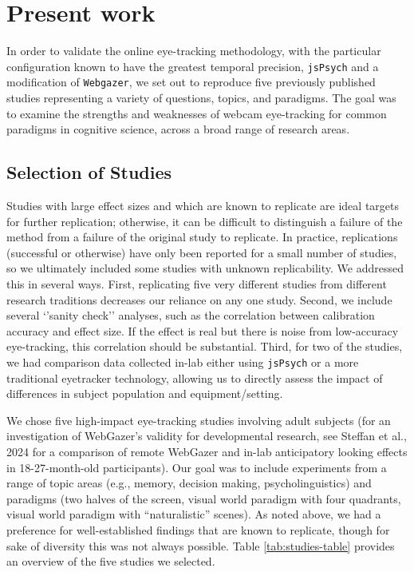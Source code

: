 \documentclass[
  man,floatsintext]{apa6}
\begin{document}
\section{Present work}\label{present-work}

In order to validate the online eye-tracking methodology, with the particular configuration known to have the greatest temporal precision, \texttt{jsPsych} and a modification of \texttt{Webgazer}, we set out to reproduce five previously published studies representing a variety of questions, topics, and paradigms. The goal was to examine the strengths and weaknesses of webcam eye-tracking for common paradigms in cognitive science, across a broad range of research areas.

\subsection{Selection of Studies}\label{selection-of-studies}

Studies with large effect sizes and which are known to replicate are ideal targets for further replication; otherwise, it can be difficult to distinguish a failure of the method from a failure of the original study to replicate. In practice, replications (successful or otherwise) have only been reported for a small number of studies, so we ultimately included some studies with unknown replicability. We addressed this in several ways. First, replicating five very different studies from different research traditions decreases our reliance on any one study. Second, we include several `'sanity check'' analyses, such as the correlation between calibration accuracy and effect size. If the effect is real but there is noise from low-accuracy eye-tracking, this correlation should be substantial. Third, for two of the studies, we had comparison data collected in-lab either using \texttt{jsPsych} or a more traditional eyetracker technology, allowing us to directly assess the impact of differences in subject population and equipment/setting.

We chose five high-impact eye-tracking studies involving adult subjects (for an investigation of WebGazer's validity for developmental research, see Steffan et al., 2024 for a comparison of remote WebGazer and in-lab anticipatory looking effects in 18-27-month-old participants). Our goal was to include experiments from a range of topic areas (e.g., memory, decision making, psycholinguistics) and paradigms (two halves of the screen, visual world paradigm with four quadrants, visual world paradigm with ``naturalistic'' scenes). As noted above, we had a preference for well-established findings that are known to replicate, though for sake of diversity this was not always possible. Table \ref{tab:studies-table} provides an overview of the five studies we selected.
\end{document}
